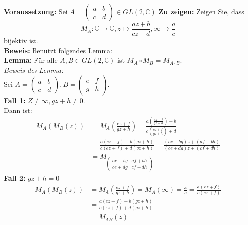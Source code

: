 \begin{problem*}[3]
\textbf{Voraussetzung:} Sei $ A = \begin{pmatrix}
a & b \\
c & d  
\end{pmatrix} \in GL(2,\mathbb{C})$
\textbf{Zu zeigen:} Zeigen Sie, dass
\begin{equation*}
  M_A : \bar{\mathbb{C}} \to \bar{\mathbb{C}}, z \mapsto \frac{az + b}{cz + d}, \infty \mapsto \frac{a}{c}
\end{equation*}
bijektiv ist.\\
\textbf{Beweis:} Benutzt folgendes Lemma: \\
\textbf{Lemma: } Für alle $ A,B \in GL(2, \mathbb{C}) $ ist $ M_A \circ M_B = M_{ A \cdot B } $. \\
\emph{Beweis des Lemma:} \\
Sei $A = \left(\begin{smallmatrix}
a & b \\
c & d
\end{smallmatrix}\right), B = \left(\begin{smallmatrix}
e & f \\
g & h
\end{smallmatrix}\right)$. \\
\textbf{Fall 1: } $Z \neq \infty, gz+h \neq 0$.\\
Dann ist:
\begin{align*}
M_A(M_B(z)) &= M_A\left(\frac{ez+f}{gz+h}\right) = \frac{a(\frac{ez+f}{gz+h}) + b}{c(\frac{ez+f}{gz+h}) + d} \\
&= \frac{a(ez+f)+b(gz+h)}{c(ez+f)+d(gz+h)} = \frac{(ae+bg)z + (af+bh)}{(ce+dg)z + (cf +dh)} \\
&= M_{ \left(\begin{smallmatrix}
ae+bg & af+bh \\
ce+dg & cf+dh 
\end{smallmatrix}\right) }
\end{align*}
\textbf{Fall 2: } $gz+h = 0$ \\
\begin{align*}
M_A(M_B(z)) &= M_A\left(\frac{ez+f}{gz+h}\right) = M_A(\infty) = \frac{a}{c} = \frac{a(ez+f)}{c(ez+f)} \\
&= \frac{a(ez+f) + b(gz+h)}{c(ez+f)+d(gz+h)} \\
&= M_{ AB }(z)

\end{align*}
\end{problem*}
